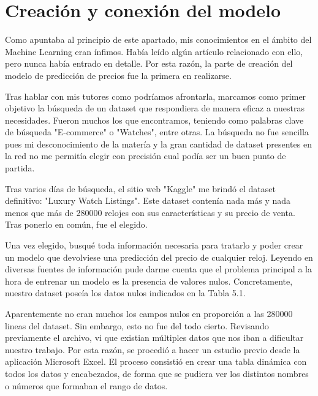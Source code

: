 \section{Creación y conexión del modelo}
	
	Como apuntaba al principio de este apartado, mis conocimientos en el ámbito del Machine Learning eran ínfimos. Había leído algún artículo relacionado con ello, pero nunca había entrado en detalle. Por esta razón, la parte de creación del modelo de predicción de precios fue la primera en realizarse. 
	
	Tras hablar con mis tutores como podríamos afrontarla, marcamos como primer objetivo la búsqueda de un dataset que respondiera de manera eficaz a nuestras necesidades. Fueron muchos los que encontramos, teniendo como palabras clave de búsqueda "E-commerce" o "Watches", entre otras. La búsqueda no fue sencilla pues mi desconocimiento de la matería y la gran cantidad de dataset presentes en la red no me permitía elegir con precisión cual podía ser un buen punto de partida.
	
	Tras varios días de búsqueda, el sitio web "Kaggle" me brindó el dataset definitivo: "Luxury Watch Listings". Este dataset contenía nada más y nada menos que más de 280000 relojes con sus características y su precio de venta. Tras ponerlo en común, fue el elegido.
	
	Una vez elegido, busqué toda información necesaria para tratarlo y poder crear un modelo que devolviese una predicción del precio de cualquier reloj. Leyendo en diversas fuentes de información pude darme cuenta que el problema principal a la hora de entrenar un modelo es la presencia de valores nulos. Concretamente, nuestro dataset poseía los datos nulos indicados en la Tabla 5.1.
	

	Aparentemente no eran muchos los campos nulos en proporción a las 280000 lineas del dataset. Sin embargo, esto no fue del todo cierto. Revisando previamente el archivo, vi que existian múltiples datos que nos iban a dificultar nuestro trabajo. Por esta razón, se procedió a hacer un estudio previo desde la aplicación Microsoft Excel. El proceso consistió en crear una tabla dinámica con todos los datos y encabezados, de forma que se pudiera ver los distintos nombres o números que formaban el rango de datos. 
	
